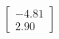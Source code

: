 \documentclass[preview]{standalone}
\begin{document}
\begin{align*}
\begin{bmatrix} -4.81 \\ 2.90 \end{bmatrix}
\end{align*}
\end{document}
